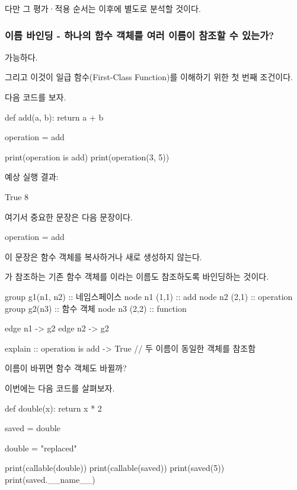 다만 그 평가·적용 순서는 이후에 별도로 분석할 것이다.

\subsubsection{이름 바인딩 - 하나의 함수 객체를 여러 이름이 참조할 수 있는가?}

가능하다.

그리고 이것이 일급 함수(First-Class Function)를 이해하기 위한 첫 번째 조건이다.

다음 코드를 보자.

\begin{dhkcode}
def add(a, b):
    return a + b

operation = add

print(operation is add)
print(operation(3, 5))
\end{dhkcode}

예상 실행 결과:

\begin{dhkzsh}
True
8
\end{dhkzsh}

여기서 중요한 문장은 다음 문장이다.

\begin{dhkcode}
operation = add
\end{dhkcode}

이 문장은  함수 객체를 복사하거나 새로 생성하지 않는다.

가 참조하는 기존 함수 객체를 이라는 이름도 참조하도록 바인딩하는 것이다.

\begin{dhkgraph}[uniform]
group g1(n1, n2) :: 네임스페이스
node n1 (1,1) :: add
node n2 (2,1) :: operation
group g2(n3) :: 함수 객체
node n3 (2,2) :: function

edge n1 -> g2
edge n2 -> g2

explain :: operation is add -> True // 두 이름이 동일한 객체를 참조함
\end{dhkgraph}

\begin{dhknote}
\begin{dhksmry}[centered]
이름이 바뀌면 함수 객체도 바뀔까?
\end{dhksmry}
\end{dhknote}

이번에는 다음 코드를 살펴보자.

\begin{dhkcode}
def double(x):
    return x * 2

saved = double

double = "replaced"

print(callable(double))
print(callable(saved))
print(saved(5))
print(saved.__name__)
\end{dhkcode}


